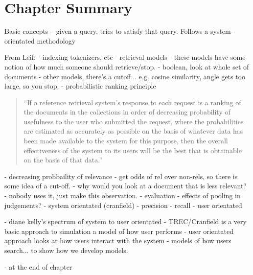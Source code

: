 \section{Chapter Summary}



Basic concepts -- given a query, tries to satisfy that query.
Follows a system-orientated methodology

From Leif:
- indexing
    tokenizers, etc
- retrieval models
    - these models have some notion of how much someone should retrieve/stop.
    - boolean, look at whole set of documents
    - other models, there's a cutoff... e.g. cosine similarity, angle gets too large, so you stop.
    - probabilistic ranking principle
    
        \begin{quote}
            ``If a reference retrieval system's response to each request is a ranking of the documents in the collections in order of decreasing probability of usefulness to the user who submitted the request, where the probabilities are estimated as accurately as possible on the basis of whatever data has been made available to the system for this purpose, then the overall effectiveness of the system to its users will be the best that is obtainable on the basis of that data.''
        \end{quote}
    
    
        - decreasing probbaility of relevance
        - get odds of rel over non-rels, so there is some idea of a cut-off.
        - why would you look at a document that is less relevant?
        - nobody uses it, just make this observation.
- evaluation
    - effects of pooling in judgements?
    - system orientated (cranfield)
        - precision
        - recall
    - user orientated
    
    - diane kelly's spectrum of system to user orientated
        - TREC/Cranfield is a very basic approach to simulation
            a model of how user performs
        - user orientated approach looks at how users interact with the system
        - models of how users search... to show how we develop models.
        
        - at the end of chapter

